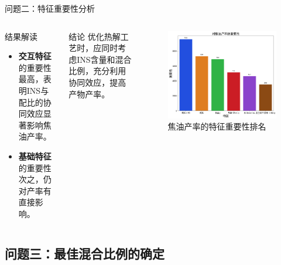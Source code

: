 \documentclass{beamer}
\begin{document}
\begin{frame}{问题二：特征重要性分析}
    \justifying
    \begin{columns}
        \begin{block}{结果解读}
            \begin{itemize}
                \item \textbf{交互特征}的重要性最高，表明INS与配比的协同效应显著影响焦油产率。
                \item \textbf{基础特征}的重要性次之，仍对产率有直接影响。
            \end{itemize}
        \end{block}
        \begin{block}{结论}
            优化热解工艺时，应同时考虑INS含量和混合比例，充分利用协同效应，提高产物产率。
        \end{block}
        \begin{figure}[htbp]
            \centering
            \includegraphics[width=\linewidth]{pic/焦油.png}
            \caption{焦油产率的特征重要性排名}
        \end{figure}
    \end{columns}
\end{frame}

\subsection{问题三：最佳混合比例的确定}
\end{document}
